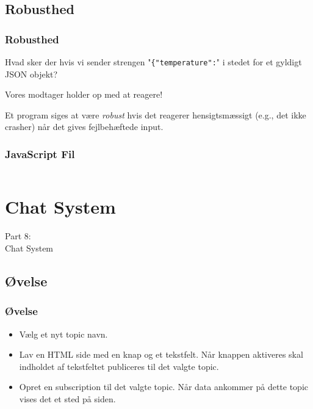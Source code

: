 \subsection{Robusthed}
\begin{frame}
    \frametitle{Robusthed}
    Hvad sker der hvis vi sender strengen "\texttt{\{"temperature":}" i stedet for et gyldigt JSON objekt?
    \pause
    
    \vspace{5mm}
    Vores modtager holder op med at reagere!
    \pause
    
    \vspace{5mm}
    Et program siges at være \textsl{robust} hvis det reagerer hensigtsmæssigt (e.g., det ikke crasher) når det gives fejlbehæftede input.
\end{frame}
\begin{frame}
    \frametitle{JavaScript Fil}
    \vspace{-2mm}
    \begin{multicols}{2}
      \inputminted[fontsize=\tiny,highlightlines={30-34}]{javascript}{../src/frontend/part7_plot/logic.js}
    \end{multicols}
\end{frame}

\section{Chat System}
\begin{frame}
    \vspace{25mm}
    \begin{center}
        \Huge{Part 8:\\Chat System}
    \end{center}
\end{frame}

\subsection{Øvelse}
\begin{frame}
    \frametitle{Øvelse}
    \begin{itemize}
      \item Vælg et nyt topic navn.
      \item Lav en HTML side med en knap og et tekstfelt. Når knappen aktiveres skal indholdet af tekstfeltet publiceres til det valgte topic.
      \item Opret en subscription til det valgte topic. Når data ankommer på dette topic vises det et sted på siden.
    \end{itemize}
\end{frame}


